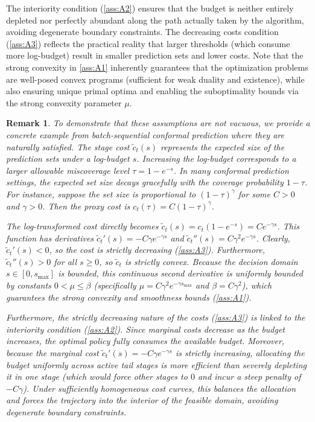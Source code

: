\documentclass{uai2026} %
\newtheorem*{remark}{Remark}
\newcommand{\1}{\mathbf{1}}
\begin{document}
The interiority condition (\ref{ass:A2}) ensures that the budget is neither entirely depleted nor perfectly abundant along the path actually taken by the algorithm, avoiding degenerate boundary constraints.
The decreasing costs condition (\ref{ass:A3}) reflects the practical reality that larger thresholds (which consume more log-budget) result in smaller prediction sets and lower costs.
Note that the strong convexity in \ref{ass:A1} inherently guarantees that the optimization problems are well-posed convex programs (sufficient for weak duality and existence), while also ensuring unique primal optima and enabling the suboptimality bounds via the strong convexity parameter $\mu$.

\begin{remark}
  To demonstrate that these assumptions are not vacuous, we provide a concrete example from batch-sequential conformal prediction where they are naturally satisfied.
  The stage cost $\tilde{c}_{t}(s)$ represents the expected size of the prediction sets under a log-budget $s$.
  Increasing the log-budget corresponds to a larger allowable miscoverage level $\tau = 1 - e^{-s}$.
  In many conformal prediction settings, the expected set size decays gracefully with the coverage probability $1-\tau$.
  For instance, suppose the set size is proportional to $(1-\tau)^{\gamma}$ for some $C > 0$ and $\gamma > 0$.
  Then the proxy cost is $c_{t}(\tau) = C(1-\tau)^{\gamma}$.

  The log-transformed cost directly becomes $\tilde{c}_{t}(s) = c_t(1-e^{-s}) = C e^{-\gamma s}$.
  This function has derivatives $\tilde{c}_{t}'(s) = -C\gamma e^{-\gamma s}$ and $\tilde{c}_{t}''(s) = C\gamma^2 e^{-\gamma s}$.
  Clearly, $\tilde{c}_{t}'(s) < 0$, so the cost is strictly decreasing (\ref{ass:A3}).
  Furthermore, $\tilde{c}_{t}''(s) > 0$ for all $s \ge 0$, so $\tilde{c}_{t}$ is strictly convex.
  Because the decision domain $s \in [0, s_{\max}]$ is bounded, this continuous second derivative is uniformly bounded by constants $0 < \mu \leq \beta$ (specifically $\mu = C\gamma^2 e^{-\gamma s_{\max}}$ and $\beta = C\gamma^2$), which guarantees the strong convexity and smoothness bounds (\ref{ass:A1}).

  Furthermore, the strictly decreasing nature of the costs (\ref{ass:A3}) is linked to the interiority condition (\ref{ass:A2}).
  Since marginal costs decrease as the budget increases, the optimal policy fully consumes the available budget.
  Moreover, because the marginal cost $\tilde{c}_{t}'(s) = -C\gamma e^{-\gamma s}$ is strictly increasing, allocating the budget uniformly across active tail stages is more efficient than severely depleting it in one stage (which would force other stages to $0$ and incur a steep penalty of $-C\gamma$).
  Under sufficiently homogeneous cost curves, this balances the allocation and forces the trajectory into the interior of the feasible domain, avoiding degenerate boundary constraints.
\end{remark}
\end{document}
